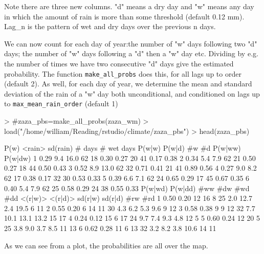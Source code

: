 \documentclass{article}
\begin{document}
Note there are three new columns.  "d" means a dry day and
"w" means any day in which the amount of rain is more than
some threshold (default 0.12 mm).  Lag\_n is the pattern
of wet and dry days over the previous n days.

We can now count for each day of year:the number of "w" days following
two "d" days; the number of "w" days following a "d" then a "w"
day etc.  Dividing by e.g. the number of times we have two consecutive
"d" days give the estimated probability.  The function {\tt make\_all\_probs}
does this, for all lags up to order  (default 2).
As well, for each day of year, we determine the mean and standard
deviation of the rain of a "w" day both unconditional, and conditioned
on lags up to {\tt max\_mean\_rain\_order} (default 1)

\begin{Schunk}
\begin{Sinput}
> #zaza_pbs=make_all_probs(zaza_wm)
> load("/home/william/Reading/rstudio/climate/zaza_pbs")
> head(zaza_pbs)
\end{Sinput}
\begin{Soutput}
  P(w) <rain> sd(rain) # days # wet days P(w|w) P(w|d) #w #d P(w|ww) P(w|dw)
1 0.29    9.4     16.0     62         18   0.30   0.27 20 41    0.17    0.38
2 0.34    5.4      7.9     62         21   0.50   0.27 18 44    0.50    0.43
3 0.52    8.9     13.0     62         32   0.71   0.41 21 41    0.89    0.56
4 0.27    9.0      8.2     62         17   0.38   0.17 32 30    0.53    0.33
5 0.39    6.6      7.1     62         24   0.65   0.29 17 45    0.67    0.35
6 0.40    5.4      7.9     62         25   0.58   0.29 24 38    0.55    0.33
  P(w|wd) P(w|dd) #ww #dw #wd #dd <(r|w)> <(r|d)> sd(r|w) sd(r|d) #rw #rd
1    0.50    0.20  12  16   8  25     2.0    12.7     2.4    19.5   6  11
2    0.55    0.20   6  14  11  30     4.3     6.2     5.3     9.6   9  12
3    0.58    0.38   9   9  12  32     7.7    10.1    13.1    13.2  15  17
4    0.24    0.12  15   6  17  24     9.7     7.4     9.3     4.8  12   5
5    0.60    0.24  12  20   5  25     3.8     9.0     3.7     8.5  11  13
6    0.62    0.28  11   6  13  32     3.2     8.2     3.8    10.6  14  11
\end{Soutput}
\end{Schunk}

As we can see from a plot, the probabilities are all over the map.
\end{document}
